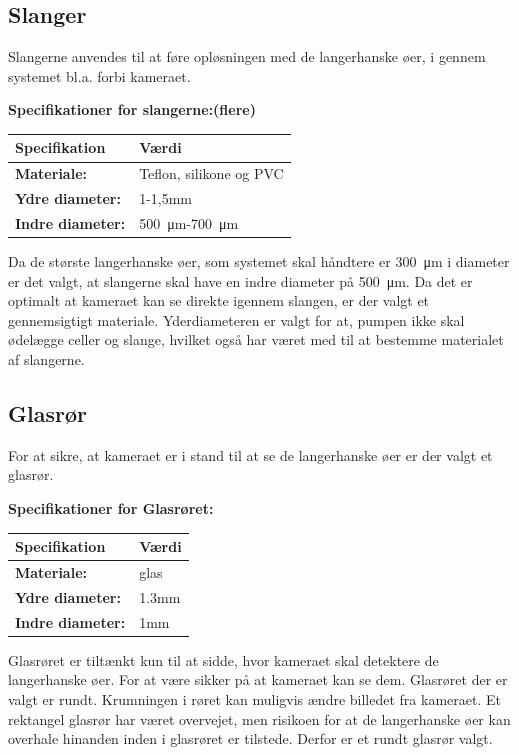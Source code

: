 \subsection{Slanger}
Slangerne anvendes til at føre opløsningen med de langerhanske øer, i gennem systemet bl.a. forbi kameraet.

\textbf{Specifikationer for slangerne:(flere)}
\begin{center}
		\begin{longtable}{ | m{6.5cm} | m{6.5cm}| } 
			\hline
			\textbf{Specifikation} &\textbf{Værdi} \\ 
			\hline
			\textbf{Materiale:} & Teflon, silikone og PVC \\ 
			\hline
			\textbf{Ydre diameter:} & 1-1,5mm  \\ 
			\hline
			\textbf{Indre diameter:} & \SI{500}{\micro\metre}-\SI{700}{\micro\metre}  \\ 
			\hline			
		\end{longtable}
\end{center}

Da de største langerhanske øer, som systemet skal håndtere er \SI{300}{\micro\metre} i diameter er det valgt, at slangerne skal have en indre diameter på \SI{500}{\micro\metre}. Da det er optimalt at kameraet kan se direkte igennem slangen, er der valgt et gennemsigtigt materiale. Yderdiameteren er valgt for at, pumpen ikke skal ødelægge celler og slange, hvilket også har været med til at bestemme materialet af slangerne. 

\subsection{Glasrør}
For at sikre, at kameraet er i stand til at se de langerhanske øer er der valgt et glasrør.

\textbf{Specifikationer for Glasrøret:} 

\begin{center}
		\begin{longtable}{ | m{6.5cm} | m{6.5cm}| } 
			\hline
			\textbf{Specifikation} &\textbf{Værdi} \\ 
			\hline
			\textbf{Materiale:} & glas \\ 
			\hline
			\textbf{Ydre diameter:} & 1.3mm  \\ 
			\hline
			\textbf{Indre diameter:} & 1mm  \\ 
			\hline			
		\end{longtable}
\end{center}

Glasrøret er tiltænkt kun til at sidde, hvor kameraet skal detektere de langerhanske øer. For at være sikker på at kameraet kan se dem. Glasrøret der er valgt er rundt. Krumningen i røret kan muligvis ændre billedet fra kameraet. Et rektangel glasrør har været overvejet, men risikoen for at de langerhanske øer kan overhale hinanden inden i glasrøret er tilstede. Derfor er et rundt glasrør valgt.





